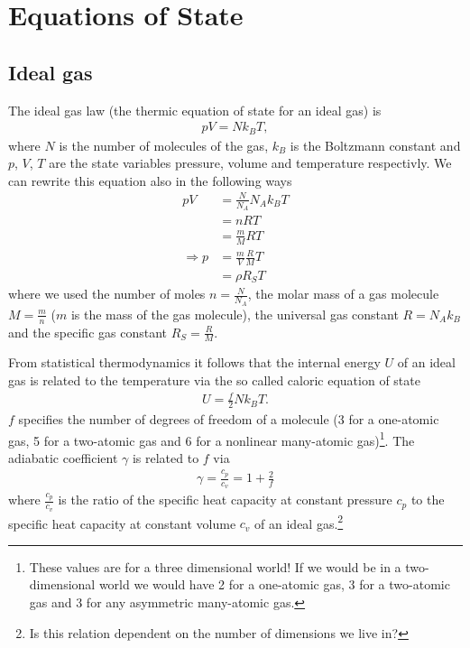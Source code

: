 \documentclass[a4paper,
					fontsize=12pt,
					twoside,
					pagesize,
					cleardoublepage=plain,
					headsepline,
					bibliography=totoc
					]{scrbook}
\begin{document}
\newpage
\appendix
\chapter{Equations of State} \label{eos}
\section{Ideal gas}
The ideal gas law (the thermic equation of state for an ideal gas)
is
\begin{align}
p V = N k_B T, \label{eq:igl}
\end{align}
where $N$ is the number of molecules of the gas, $k_B$ is the Boltzmann
constant and $p$, $V$, $T$ are the state variables pressure, volume and
temperature respectivly. We can rewrite this equation also in the following 
ways
\begin{align*}
p V &= \frac{N}{N_A} N_A k_B  T \\ 
	 &= n R T \\
    &= \frac{m}{M} R T \\
\Rightarrow p &= \frac{m}{V} \frac{R}{M} T \\
              &= \rho R_S T
\end{align*}
where we used the number of moles $n=\frac{N}{N_A}$, 
the molar mass of a gas molecule $M = \frac{m}{n}$ ($m$ is the
mass of the gas molecule), the universal gas constant $R= N_A k_B$ and the
specific gas constant $R_S=\frac{R}{M}$.

From statistical thermodynamics it follows that the
internal energy $U$ of an ideal gas is related to the temperature via the
so called caloric equation of state
\begin{align}
U = \frac{f}{2}N k_B T. \label{eq:caleos}
\end{align}
$f$ specifies the number of degrees of freedom of a molecule (3 for a 
one-atomic gas, 5 for a two-atomic gas and 6 for a nonlinear many-atomic
gas)\footnote{These values are for a three dimensional world! If we would be
in a two-dimensional world we would have 2 for a 
one-atomic gas, 3 for a two-atomic gas and 3 for
any asymmetric many-atomic gas.}.
The adiabatic coefficient $\gamma$ is related to $f$ via
\begin{align}
\gamma = \frac{c_p}{c_v} = 1 + \frac{2}{f} \label{eq:gam}
\end{align}
where $\frac{c_p}{c_v}$ is the ratio of the specific
heat capacity at constant pressure $c_p$ to the specific heat capacity at
constant volume $c_v$ of an ideal gas.\footnote{Is this relation dependent on
the number of dimensions we live in?}
\end{document}
